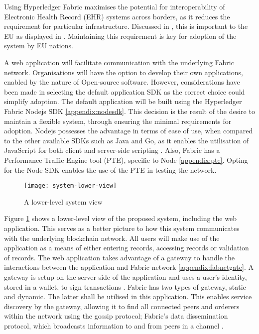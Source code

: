 Using Hyperledger Fabric maximises the potential for interoperability of Electronic Health Record (EHR) systems across borders, as it reduces the requirement for particular infrastructure. 
Discussed in \cite{kierkegaard_electronic_2011}, this is important to the EU as displayed in \cite{noauthor_directive_2011}. 
Maintaining this requirement is key for adoption of the system by EU nations.

A web application will facilitate communication with the underlying Fabric network. 
Organisations will have the option to develop their own applications, enabled by the nature of Open-source software. 
However, considerations have been made in selecting the default application SDK as the correct choice could simplify adoption. 
The default application will be built using the Hyperledger Fabric Nodejs SDK \ref{appendix:nodesdk}. 
This decision is the result of the desire to maintain a flexible system, through ensuring the minimal requirements for adoption. 
Nodejs possesses the advantage in terms of ease of use, when compared to the other available SDKs such as Java and Go, as it enables the utilisation of JavaScript for both client and server-side scripting \cite{nodejs_documentation_nodate}. 
Also, Fabric has a Performance Traffic Engine tool (PTE), specific to Node \ref{appendix:pte}. 
Opting for the Node SDK enables the use of the PTE in testing the network. 

\begin{figure}[H]
  \texttt{[image: system-lower-view]}
  \caption{A lower-level system view}
  \label{fig:lower}
\end{figure}

Figure \ref{fig:lower} shows a lower-level view of the proposed system, including the web application. 
This serves as a better picture to how this system communicates with the underlying blockchain network. 
All users will make use of the application as a means of either entering records, accessing records or validation of records. 
The web application takes advantage of a gateway to handle the interactions between the application and Fabric network \ref{appendix:fabnetgate}. 
A gateway is setup on the server-side of the application and uses a user's identity, stored in a wallet, to sign transactions \cite{noauthor_gateway_nodate}. 
Fabric has two types of gateway, static and dynamic. 
The latter shall be utilised in this application. This enables service discovery by the gateway, allowing it to find all connected peers and orderers within the network using the gossip protocol; Fabric's data dissemination protocol, which broadcasts information to and from peers in a channel \cite{noauthor_gateway_nodate}. 



